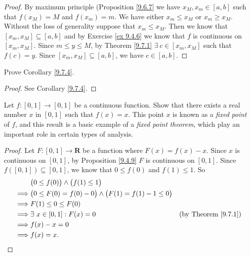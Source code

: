 \begin{proof}
    By maximum principle (Proposition \ref{9.6.7} we have \(x_M, x_m \in [a, b]\) such that \(f(x_M) = M\) and \(f(x_m) = m\).
    We have either \(x_m \leq x_M\) or \(x_m \geq x_M\).
    Without the loss of generality suppose that \(x_m \leq x_M\).
    Then we know that \([x_m, x_M] \subseteq [a, b]\) and by Exercise \ref{ex 9.4.6} we know that \(f\) is continuous on \([x_m, x_M]\).
    Since \(m \leq y \leq M\), by Theorem \ref{9.7.1} \(\exists\ c \in [x_m, x_M]\) such that \(f(c) = y\).
    Since \([x_m, x_M] \subseteq [a, b]\), we have \(c \in [a, b]\).
\end{proof}

\exercisesection

\begin{exercise}\label{ex 9.7.1}
    Prove Corollary \ref{9.7.4}.
\end{exercise}

\begin{proof}
    See Corollary \ref{9.7.4}.
\end{proof}

\begin{exercise}\label{ex 9.7.2}
    Let \(f : [0, 1] \to [0, 1]\) be a continuous function.
    Show that there exists a real number \(x\) in \([0, 1]\) such that \(f(x) = x\).
    This point \(x\) is known as a \emph{fixed point} of \(f\), and this result is a basic example of a \emph{fixed point theorem}, which play an important role in certain types of analysis.
\end{exercise}

\begin{proof}
    Let \(F : [0, 1] \to \mathbf{R}\) be a function where \(F(x) = f(x) - x\).
    Since \(x\) is continuous on \([0, 1]\), by Proposition \ref{9.4.9} \(F\) is continuous on \([0, 1]\).
    Since \(f([0, 1]) \subseteq [0, 1]\), we know that \(0 \leq f(0)\) and \(f(1) \leq 1\).
    So
    \begin{align*}
        & \big(0 \leq f(0)\big) \land \big(f(1) \leq 1\big) \\
        \implies & \big(0 \leq F(0) = f(0) - 0\big) \land \big(F(1) = f(1) - 1 \leq 0\big) \\
        \implies & F(1) \leq 0 \leq F(0) \\
        \implies & \exists\ x \in [0, 1] : F(x) = 0 & \text{(by Theorem \ref{9.7.1})} \\
        \implies & f(x) - x = 0 \\
        \implies & f(x) = x.
    \end{align*}
\end{proof}